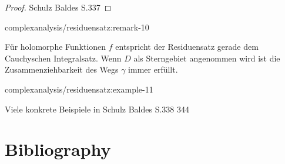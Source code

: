 \documentclass[letterpaper,10pt,german]{jupyterBook}
\begin{document}
\begin{proof}
 Schulz Baldes S.337
\end{proof}
\begin{remark}{}{complexanalysis/residuensatz:remark-10}



\par
Für holomorphe Funktionen \(f\) entspricht der Residuensatz gerade dem Cauchyschen Integralsatz.
Wenn \(D\) als Sterngebiet angenommen wird ist die Zusammenziehbarkeit des Wegs \(\gamma\) immer erfüllt.
\end{remark}
\begin{example}{}{complexanalysis/residuensatz:example-11}



\par
Viele konkrete Beispiele in Schulz Baldes S.338 344
\end{example}


\chapter{Bibliography}
\label{\detokenize{references:bibliography}}\label{\detokenize{references::doc}}
\par
\end{document}
